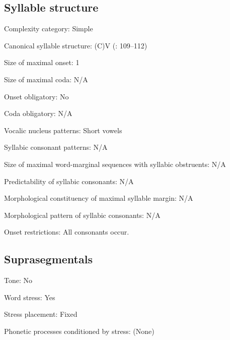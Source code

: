 {\subsection*{Syllable structure}
\begin{appendixdesc}

\item[Complexity category:] Simple

\item[Canonical syllable structure:] (C)V (\citealt{Romero-Figeroa1997}: 109--112)

\item[Size of maximal onset:] 1

\item[Size of maximal coda:] N/A

\item[Onset obligatory:] No

\item[Coda obligatory:] N/A

\item[Vocalic nucleus patterns:] Short vowels

\item[Syllabic consonant patterns:] N/A

\item[Size of maximal word-marginal sequences with syllabic obstruents:] N/A

\item[Predictability of syllabic consonants:] N/A

\item[Morphological constituency of maximal syllable margin:] N/A

\item[Morphological pattern of syllabic consonants:] N/A

\item[Onset restrictions:] All consonants occur.
\end{appendixdesc}
\subsection*{Suprasegmentals}
\begin{appendixdesc}
\item[Tone:] No

\item[Word stress:] Yes

\item[Stress placement:] Fixed

\item[Phonetic processes conditioned by stress:] (None)


\end{appendixdesc}}
